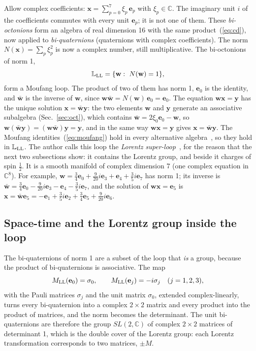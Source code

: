 \documentclass[aps,prd,twocolumn,superscriptaddress,nofootinbib,floatfix,longbibliography]{revtex4-2}
\newcommand{\LL}{{\rm LL}}
\newcommand{\e}[1]{\mathbf e_{#1}}
\begin{document}
Allow complex coefficients: $\mathbf x=\sum_{p=0}^7\xi_p\,\e p$ with $\xi_p\in\mathbb C$. The imaginary unit $i$ of the
coefficients commutes with every unit $\e p$; it is not one of them. These \emph{bi-octonions} form an algebra of
real dimension 16 with the same product~(\ref{eq:cd}), now applied to \emph{bi-quaternions} (quaternions with complex
coefficients). The norm $N(\mathbf x)=\sum_p\xi_p^2$ is now a complex number, still multiplicative. The bi-octonions of
norm 1,
\begin{equation}
\mathbb L_\LL=\{\mathbf w:\ N(\mathbf w)=1\},
\label{eq:loop}
\end{equation}
form a Moufang loop. The product of two of them has norm 1, $\e0$ is the identity, and $\bar{\mathbf w}$ is the inverse
of $\mathbf w$, since $\mathbf w\bar{\mathbf w}=N(\mathbf w)\,\e0=\e0$. The equation $\mathbf w\mathbf x=\mathbf y$ has the
unique solution $\mathbf x=\bar{\mathbf w}\mathbf y$: the two elements $\mathbf w$ and $\mathbf y$ generate an associative
subalgebra (Sec.~\ref{sec:oct}), which contains $\bar{\mathbf w}=2\xi_0\e0-\mathbf w$, so $\mathbf w(\bar{\mathbf
w}\mathbf y)=(\mathbf w\bar{\mathbf w})\mathbf y=\mathbf y$, and in the same way $\mathbf w\mathbf x=\mathbf y$ gives
$\mathbf x=\bar{\mathbf w}\mathbf y$. The Moufang identities~(\ref{eq:moufang}) hold in every alternative
algebra~\cite{Schafer1966}, so they hold in $\mathbb L_\LL$. The author calls this loop the \emph{Lorentz
super-loop}~\cite{Nash2026}, for the reason that the next two subsections show: it contains the Lorentz group, and beside
it charges of spin $\frac12$. It is a smooth manifold of complex dimension 7 (one complex equation in $\mathbb C^8$). For
example, $\mathbf w=\tfrac{3}{4}\e{0}+\tfrac{9}{20}i\e{3}+\e{4}+\tfrac{3}{5}i\e{7}$ has norm 1; its inverse is $\bar{\mathbf
w}=\tfrac{3}{4}\e{0}-\tfrac{9}{20}i\e{3}-\e{4}-\tfrac{3}{5}i\e{7}$, and the solution of $\mathbf w\mathbf x=\e5$ is $\mathbf x=\bar{\mathbf w}\e5=-\e{1}+\tfrac{3}{5}i\e{2}+\tfrac{3}{4}\e{5}+\tfrac{9}{20}i\e{6}$.

\subsection{Space-time and the Lorentz group inside the loop}
\label{sec:lorentz}

The bi-quaternions of norm 1 are a subset of the loop that \emph{is} a group, because the product of bi-quaternions is
associative. The map
\begin{equation}
M_\LL(\e0)=\sigma_0,\qquad M_\LL(\e j)=-i\sigma_j\quad(j=1,2,3),
\label{eq:Mmap}
\end{equation}
with the Pauli matrices $\sigma_j$ and the unit matrix $\sigma_0$, extended complex-linearly, turns every bi-quaternion
into a complex $2\times2$ matrix and every product into the product of matrices, and the norm becomes the determinant.
The unit bi-quaternions are therefore the group $SL(2,\mathbb C)$ of complex $2\times2$ matrices of determinant 1, which is
the double cover of the Lorentz group: each Lorentz transformation corresponds to two matrices, $\pm M$.
\end{document}
